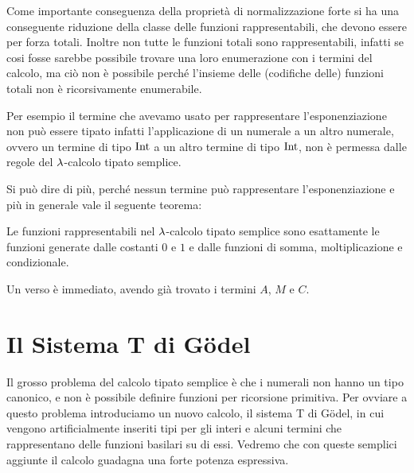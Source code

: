 \documentclass[]{marticle}
\begin{document}
Come importante conseguenza della propriet\`a di normalizzazione forte si ha una
conseguente riduzione della classe delle funzioni rappresentabili, che devono
essere per forza totali. Inoltre non tutte le funzioni totali sono
rappresentabili, infatti se cosi fosse sarebbe possibile trovare una loro
enumerazione con i termini del calcolo, ma ci\`o non \`e possibile perch\'e
l'insieme delle (codifiche delle) funzioni totali non \`e ricorsivamente
enumerabile.

Per esempio il termine che avevamo usato per rappresentare l'esponenziazione non
pu\`o essere tipato infatti l'applicazione di un numerale a un altro numerale,
ovvero un termine di tipo $\text{Int}$ a un altro termine di tipo $\text{Int}$, non \`e
permessa dalle regole del $\lambda$-calcolo tipato semplice.

Si pu\`o dire di pi\`u, perch\'e nessun termine pu\`o rappresentare
l'esponenziazione e pi\`u in generale vale il seguente teorema:

\begin{block}[Teorema]
    Le funzioni rappresentabili nel $\lambda$-calcolo tipato semplice sono
    esattamente le funzioni generate dalle costanti $0$ e $1$ e dalle funzioni
    di somma, moltiplicazione e condizionale.
\end{block}

Un verso \`e immediato, avendo gi\`a trovato i termini $A$, $M$ e $C$.

\section{Il Sistema T di G\"odel}

Il grosso problema del calcolo tipato semplice \`e che i numerali non hanno un
tipo canonico, e non \`e possibile definire funzioni per ricorsione primitiva.
Per ovviare a questo problema introduciamo un nuovo calcolo, il sistema T di
G\"odel, in cui vengono artificialmente inseriti tipi per gli interi e alcuni
termini che rappresentano delle funzioni basilari su di essi. Vedremo che con
queste semplici aggiunte il calcolo guadagna una forte potenza espressiva.
\end{document}
